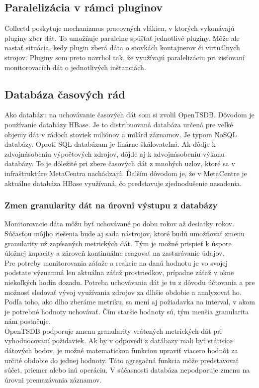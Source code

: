 \documentclass[printed,11pt,twoside,color,cover,table]{fithesis3}
\begin{document}
\subsection{Paralelizácia v rámci pluginov}
Collectd poskytuje mechanizmus pracovných vlákien, v ktorých vykonávajú pluginy zber dát. To umožňuje paralelne spúšťať jednotlivé pluginy.
Môže ale nastať situácia, kedy plugin zberá dáta o stovkách kontajnerov či virtuálnych strojov. Pluginy som preto navrhol tak, že využívajú
paralelizáciu pri zisťovaní monitorovacích dát o jednotlivých inštanciách. 

\subsection{Databáza časových rád}
Ako databázu na uchovávanie časových dát som si zvolil OpenTSDB. Dôvodom je používanie databázy HBase. Je to distribuovaná databáza určená pre veľké objemy dát v rádoch stoviek miliónov a milárd záznamov. 
Je typom NoSQL databázy. Oproti SQL databázam je linárne škálovateľná. Ak dôdje k zdvojnásobeniu výpočtových zdrojov, dôjde aj k zdvojnásobeniu výkonu databázy. To je dôležité pri zbere časových dát z mnohých
uzlov, ktoré sa v infraštruktúre MetaCentra nachádzajú. Ďalším dôvodom je, že v MetaCentre je aktuálne databáza HBase využívaná, čo predstavuje zjednodušenie nasadenia. 

\subsubsection{Zmen granularity dát na úrovni výstupu z databázy}
Monitorovacie dáta môžu byť uchovávané po dobu rokov až desiatky rokov. Súčasťou môjho riešenia bude aj sada nástrojov, ktoré budú
umožňovať zmenu granularity už zapísaných metrických dát. Tým je možné prispieť k úspore úložnej kapacity a zároveň kontinuálne reagovať na
zastarávanie údajov. 
\\Pre potreby monitorovania záťaže a reakcie na danú hodnotu je vo svojej podstate významná len aktuálna záťaž prostriedkov, prípadne záťaž v okne niekoľkých hodín 
dozadu. Potreba uchovávania dát je tu z dôvodu účtovania a pre možnosť sledovať vývoj využívania zdrojov za dlhšie obdobie a analyzovať ho.
Podľa toho, ako dlho zberáme metriku, sa mení aj požiadavka na interval, v akom je potrebné hodnoty uchovávať. Čím staršie hodnoty sú, tým menšia granularita nám postačuje.
\\OpenTSDB podporuje zmenu granularity vrátených metrických dát pri vyhodnocovaní požidaviek. Ak by v odpovedi z datábazy mali byť státisíce dátových bodov, je možné matematickou funkciou upraviť viacero hodnôt
za určité obdobie  do jednej hodnoty. Táto agregačná funkcia môže predstavovať súčet, priemer alebo inú operáciu. V súčasnosti databáza nepodporuje zmenu na úrovni premazávania záznamov.
  
\end{document}
